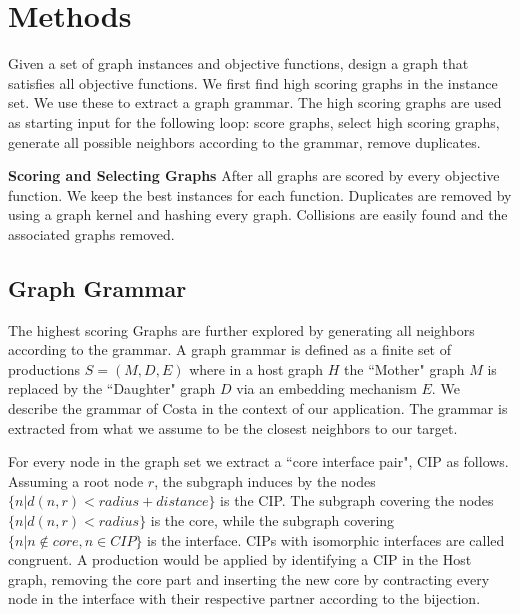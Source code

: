 \documentclass{esannV2}
\begin{document}


\section{Methods}
Given a set of graph instances and objective functions, 
design a graph that satisfies all objective functions. 
We first find high scoring graphs in the instance set. We use these to extract a graph grammar. 
The high scoring graphs are used as starting input for the following loop: 
score graphs, 
select high scoring graphs, 
generate all possible neighbors according to the grammar, 
remove duplicates.

\textbf{Scoring and Selecting Graphs}
After all graphs are scored by every objective function. We keep the best instances for 
each function.  
Duplicates are removed by using a graph kernel and hashing every graph. 
Collisions are easily found and the associated graphs removed.

\subsection{Graph Grammar}
The highest scoring Graphs are further explored by generating all neighbors according to 
the grammar. A graph grammar is defined as a finite set of productions $S=(M,D,E)$ where in 
a host graph $H$ the ``Mother" graph $M$ is replaced by the ``Daughter" graph $D$ via an 
embedding mechanism $E$. We describe the grammar of Costa \cite{costa16gl} in the context of our application.
The grammar is extracted from what we assume to be the closest neighbors to our target.

For every node in the graph set we extract a ``core interface pair", CIP as follows.
Assuming a root node $r$, 
the subgraph induces by the nodes $\{ n | d(n,r) < radius+distance \}$ is the CIP.
The subgraph covering the nodes $\{ n | d(n,r) < radius \}$ is the core, while the subgraph covering
$\{ n | n \notin core , n \in CIP \}$ is the interface.
CIPs with isomorphic interfaces are called congruent.
A production would be applied by identifying a CIP in the Host graph, 
removing the core part and inserting the 
new core by contracting every node in the interface 
with their respective partner according to the bijection.
\end{document}
